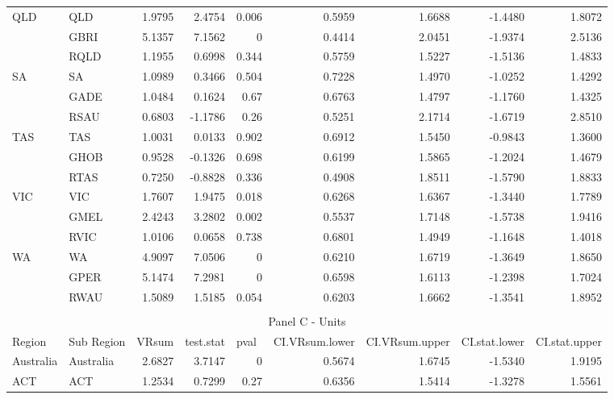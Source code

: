 \begin{table}[htbp]
{\begin{tabular}{llrrrrrrr}
    \multirow{3}[0]{*}{QLD} & QLD   & 1.9795 & 2.4754 & 0.006 & 0.5959 & 1.6688 & -1.4480 & 1.8072 \\
          & GBRI  & 5.1357 & 7.1562 & 0     & 0.4414 & 2.0451 & -1.9374 & 2.5136 \\
          & RQLD  & 1.1955 & 0.6998 & 0.344 & 0.5759 & 1.5227 & -1.5136 & 1.4833 \\
    \multirow{3}[0]{*}{SA} & SA    & 1.0989 & 0.3466 & 0.504 & 0.7228 & 1.4970 & -1.0252 & 1.4292 \\
          & GADE  & 1.0484 & 0.1624 & 0.67  & 0.6763 & 1.4797 & -1.1760 & 1.4325 \\
          & RSAU  & 0.6803 & -1.1786 & 0.26  & 0.5251 & 2.1714 & -1.6719 & 2.8510 \\
    \multirow{3}[0]{*}{TAS} & TAS   & 1.0031 & 0.0133 & 0.902 & 0.6912 & 1.5450 & -0.9843 & 1.3600 \\
          & GHOB  & 0.9528 & -0.1326 & 0.698 & 0.6199 & 1.5865 & -1.2024 & 1.4679 \\
          & RTAS  & 0.7250 & -0.8828 & 0.336 & 0.4908 & 1.8511 & -1.5790 & 1.8833 \\
    \multirow{3}[0]{*}{VIC} & VIC   & 1.7607 & 1.9475 & 0.018 & 0.6268 & 1.6367 & -1.3440 & 1.7789 \\
          & GMEL  & 2.4243 & 3.2802 & 0.002 & 0.5537 & 1.7148 & -1.5738 & 1.9416 \\
          & RVIC  & 1.0106 & 0.0658 & 0.738 & 0.6801 & 1.4949 & -1.1648 & 1.4018 \\
    \multirow{3}[1]{*}{WA} & WA    & 4.9097 & 7.0506 & 0     & 0.6210 & 1.6719 & -1.3649 & 1.8650 \\
          & GPER  & 5.1474 & 7.2981 & 0     & 0.6598 & 1.6113 & -1.2398 & 1.7024 \\
          & RWAU  & 1.5089 & 1.5185 & 0.054 & 0.6203 & 1.6662 & -1.3541 & 1.8952 \\
    \midrule \\
    \multicolumn{9}{c}{Panel C - Units} \\
    \midrule
    Region & Sub Region & \multicolumn{1}{l}{VRsum} & \multicolumn{1}{l}{test.stat} & \multicolumn{1}{l}{pval} & \multicolumn{1}{l}{CI.VRsum.lower} & \multicolumn{1}{l}{CI.VRsum.upper} & \multicolumn{1}{l}{CI.stat.lower} & \multicolumn{1}{l}{CI.stat.upper} \\
    \midrule
    Australia & Australia & 2.6827 & 3.7147 & 0     & 0.5674 & 1.6745 & -1.5340 & 1.9195 \\
    ACT   & ACT   & 1.2534 & 0.7299 & 0.27  & 0.6356 & 1.5414 & -1.3278 & 1.5561 \\

\end{tabular}}
\end{table}
